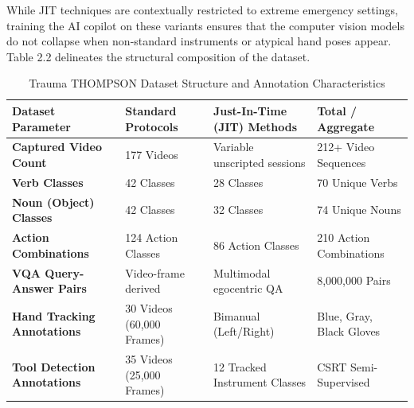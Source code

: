 \documentclass[12pt,a4paper]{report}
\begin{document}
While JIT techniques are contextually restricted to extreme emergency settings, training the AI copilot on these variants ensures that the computer vision models do not collapse when non-standard instruments or atypical hand poses appear. Table 2.2 delineates the structural composition of the dataset.

\begin{table}[htbp]
\centering
\caption{Trauma THOMPSON Dataset Structure and Annotation Characteristics}
\label{tab:dataset_breakdown}
\small
\begin{tabularx}{\textwidth}{@{}l X X X@{}}
\toprule
\textbf{Dataset Parameter} & \textbf{Standard Protocols} & \textbf{Just-In-Time (JIT) Methods} & \textbf{Total / Aggregate} \\
\midrule
\textbf{Captured Video Count} & 177 Videos & Variable unscripted sessions & 212+ Video Sequences \\
\textbf{Verb Classes} & 42 Classes & 28 Classes & 70 Unique Verbs \\
\textbf{Noun (Object) Classes} & 42 Classes & 32 Classes & 74 Unique Nouns \\
\textbf{Action Combinations} & 124 Action Classes & 86 Action Classes & 210 Action Combinations \\
\textbf{VQA Query-Answer Pairs} & Video-frame derived & Multimodal egocentric QA & 8,000,000 Pairs \\
\textbf{Hand Tracking Annotations} & 30 Videos (60,000 Frames) & Bimanual (Left/Right) & Blue, Gray, Black Gloves \\
\textbf{Tool Detection Annotations} & 35 Videos (25,000 Frames) & 12 Tracked Instrument Classes & CSRT Semi-Supervised \\
\bottomrule
\end{tabularx}
\end{table}
\end{document}
